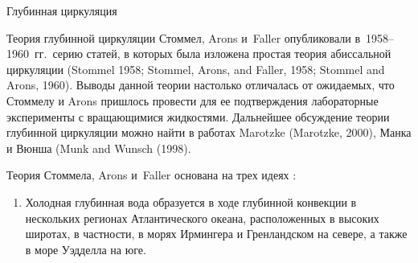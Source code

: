 \begin{chapter}{Глубинная циркуляция}
\begin{section}{Теория глубинной циркуляции}
%
%
Стоммел, Arons и~Faller опубликовали в~1958--1960~гг.\ серию статей, в которых
была изложена простая теория абиссальной циркуляции%
%
(Stommel 1958; Stommel, Arons, and Faller, 1958; Stommel and Arons, 1960). 
Выводы данной теории настолько отличалась от ожидаемых, что Стоммелу 
и Arons пришлось провести для ее подтверждения лабораторные эксперименты
с вращающимися жидкостями. Дальнейшее обсуждение теории глубинной циркуляции
можно найти в работах Marotzke (Marotzke, 2000), 
Манка и Вюнша (Munk and Wunsch (1998).
%

Теория Стоммела, Arons и~Faller
основана на трех идеях%
%
:
%
%
\begin{enumerate}
\item
Холодная глубинная вода образуется в ходе глубинной конвекции в нескольких
регионах Атлантического океана, расположенных в высоких широтах, в частности,
в морях Ирмингера и Гренландском на севере, а также в море Уэдделла на юге. 
%


\end{enumerate}
\end{section}
\end{chapter}
